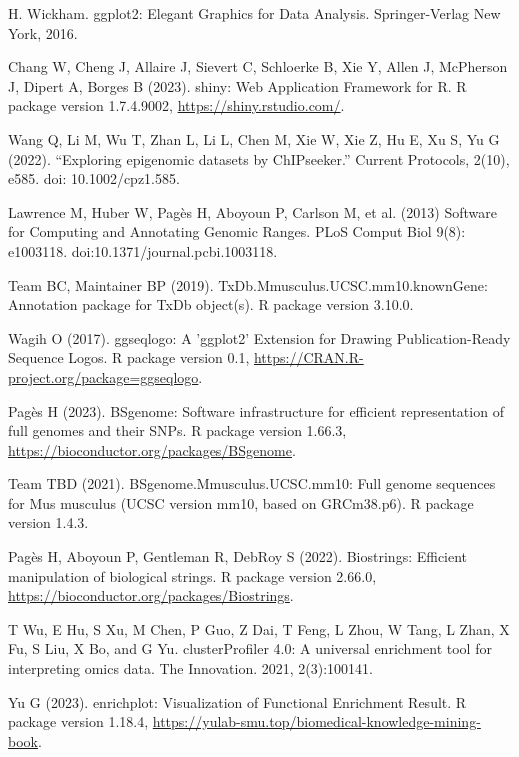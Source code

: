 \documentclass[12pt]{article}
\begin{document}
\begin{thebibliography}{99}
 H. Wickham. ggplot2: Elegant Graphics for Data Analysis.
Springer-Verlag New York, 2016.

 Chang W, Cheng J, Allaire J, Sievert C, Schloerke B, Xie Y,
Allen J, McPherson J, Dipert A, Borges B (2023). shiny: Web Application
Framework for R. R package version 1.7.4.9002, \url{https://shiny.rstudio.com/}.

 Wang Q, Li M, Wu T, Zhan L, Li L, Chen M, Xie W, Xie Z,
Hu E, Xu S, Yu G (2022). “Exploring epigenomic datasets by ChIPseeker.”
Current Protocols, 2(10), e585. doi: 10.1002/cpz1.585.

 Lawrence M, Huber W, Pag\`es H, Aboyoun P, Carlson M,
et al. (2013) Software for Computing and Annotating Genomic Ranges. PLoS Comput
Biol 9(8): e1003118. doi:10.1371/journal.pcbi.1003118.

 Team BC, Maintainer BP (2019). 
TxDb.Mmusculus.UCSC.mm10.knownGene: Annotation package for TxDb object(s).
R package version 3.10.0.

 Wagih O (2017). ggseqlogo: A 'ggplot2' Extension for
Drawing Publication-Ready Sequence Logos. R package version 0.1, \newline
\url{https://CRAN.R-project.org/package=ggseqlogo}.

 Pagès H (2023). BSgenome: Software infrastructure for
efficient representation of full genomes and their SNPs. R package version
1.66.3, \newline
\url{https://bioconductor.org/packages/BSgenome}.

 Team TBD (2021). BSgenome.Mmusculus.UCSC.mm10: Full
genome sequences for Mus musculus (UCSC version mm10, based on GRCm38.p6). R
package version 1.4.3.

 Pagès H, Aboyoun P, Gentleman R, DebRoy S (2022).
Biostrings: Efficient manipulation of biological strings. R package version
2.66.0, \newline
\url{https://bioconductor.org/packages/Biostrings}.

 T Wu, E Hu, S Xu, M Chen, P Guo, Z Dai, T Feng,
L Zhou, W Tang, L Zhan, X Fu, S Liu, X Bo, and G Yu. clusterProfiler 4.0:
A universal enrichment tool for interpreting omics data. The Innovation. 2021,
2(3):100141.

 Yu G (2023). enrichplot: Visualization of Functional
Enrichment Result. R package version 1.18.4, \newline
\url{https://yulab-smu.top/biomedical-knowledge-mining-book}.


\end{thebibliography}
\end{document}
